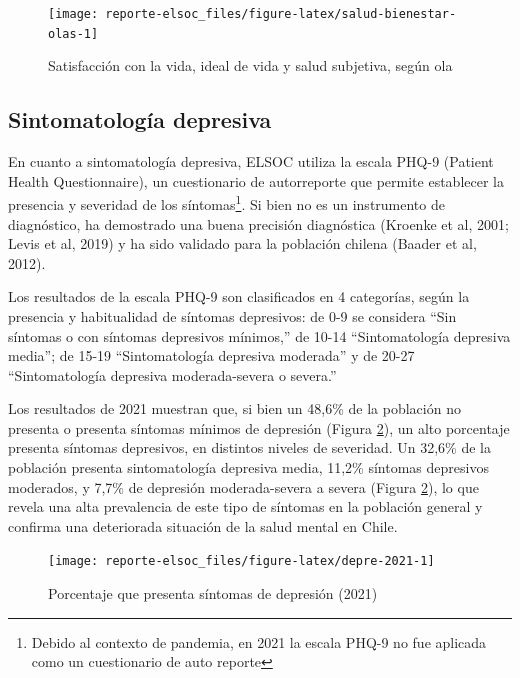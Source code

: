 \documentclass[
  12pt,
]{book}
\begin{document}
\begin{figure}

{\centering \texttt{[image: reporte-elsoc\_files/figure-latex/salud-bienestar-olas-1]} 

}

\caption{Satisfacción con la vida, ideal de vida y salud subjetiva, según ola}\label{fig:salud-bienestar-olas}
\end{figure}

\hypertarget{sintomatologuxeda-depresiva}{%
\subsection*{Sintomatología depresiva}\label{sintomatologuxeda-depresiva}}

En cuanto a sintomatología depresiva, ELSOC utiliza la escala PHQ-9 (Patient Health Questionnaire), un cuestionario de autorreporte que permite establecer la presencia y severidad de los síntomas\footnote{Debido al contexto de pandemia, en 2021 la escala PHQ-9 no fue aplicada como un cuestionario de auto reporte}. Si bien no es un instrumento de diagnóstico, ha demostrado una buena precisión diagnóstica (Kroenke et al, 2001; Levis et al, 2019) y ha sido validado para la población chilena (Baader et al, 2012).

Los resultados de la escala PHQ-9 son clasificados en 4 categorías, según la presencia y habitualidad de síntomas depresivos: de 0-9 se considera ``Sin síntomas o con síntomas depresivos mínimos,'' de 10-14 ``Sintomatología depresiva media''; de 15-19 ``Sintomatología depresiva moderada'' y de 20-27 ``Sintomatología depresiva moderada-severa o severa.''

Los resultados de 2021 muestran que, si bien un 48,6\% de la población no presenta o presenta síntomas mínimos de depresión (Figura \ref{fig:depre-2021}), un alto porcentaje presenta síntomas depresivos, en distintos niveles de severidad. Un 32,6\% de la población presenta sintomatología depresiva media, 11,2\% síntomas depresivos moderados, y 7,7\% de depresión moderada-severa a severa (Figura \ref{fig:depre-2021}), lo que revela una alta prevalencia de este tipo de síntomas en la población general y confirma una deteriorada situación de la salud mental en Chile.

\begin{figure}

{\centering \texttt{[image: reporte-elsoc\_files/figure-latex/depre-2021-1]} 

}

\caption{Porcentaje que presenta síntomas de depresión (2021)}\label{fig:depre-2021}
\end{figure}
\end{document}
